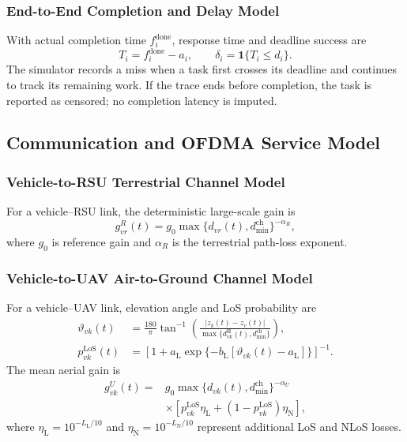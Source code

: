 \subsubsection{End-to-End Completion and Delay Model}
With actual completion time $f_i^{\mathrm{done}}$, response time and
deadline success are
\begin{equation}
T_i=f_i^{\mathrm{done}}-a_i,\qquad
\delta_i=\mathbf 1\{T_i\le d_i\}.
\label{eq:actual_latency}
\end{equation}
The simulator records a miss when a task first crosses its deadline and
continues to track its remaining work. If the trace ends before completion,
the task is reported as censored; no completion latency is imputed.

\subsection{Communication and OFDMA Service Model}
\subsubsection{Vehicle-to-RSU Terrestrial Channel Model}
For a vehicle--RSU link, the deterministic large-scale gain is
\begin{equation}
g_{vr}^{R}(t)=g_0
\max\{d_{vr}(t),d_{\min}^{\mathrm{ch}}\}^{-\alpha_R},
\label{eq:rsu_gain}
\end{equation}
where $g_0$ is reference gain and $\alpha_R$ is the terrestrial
path-loss exponent.

\subsubsection{Vehicle-to-UAV Air-to-Ground Channel Model}
For a vehicle--UAV link, elevation angle and LoS probability are
\begin{equation}
\begin{aligned}
\vartheta_{vk}(t)&=
\frac{180}{\pi}\tan^{-1}\!\left(
\frac{|z_k(t)-z_v(t)|}
{\max\{d_{vk}^{\mathrm H}(t),d_{\min}^{\mathrm{ch}}\}}\right),\\
p_{vk}^{\mathrm{LoS}}(t)&=
\left[1+a_{\mathrm L}
\exp\{-b_{\mathrm L}[\vartheta_{vk}(t)-a_{\mathrm L}]\}\right]^{-1}.
\end{aligned}
\label{eq:los}
\end{equation}
The mean aerial gain is
\begin{equation}
\begin{aligned}
g_{vk}^{U}(t)={}&g_0
\max\{d_{vk}(t),d_{\min}^{\mathrm{ch}}\}^{-\alpha_U}\\
&\times\left[p_{vk}^{\mathrm{LoS}}\eta_{\mathrm L}
+(1-p_{vk}^{\mathrm{LoS}})\eta_{\mathrm N}\right],
\end{aligned}
\label{eq:uav_gain}
\end{equation}
where $\eta_{\mathrm L}=10^{-L_{\mathrm L}/10}$ and
$\eta_{\mathrm N}=10^{-L_{\mathrm N}/10}$ represent additional LoS
and NLoS losses.

